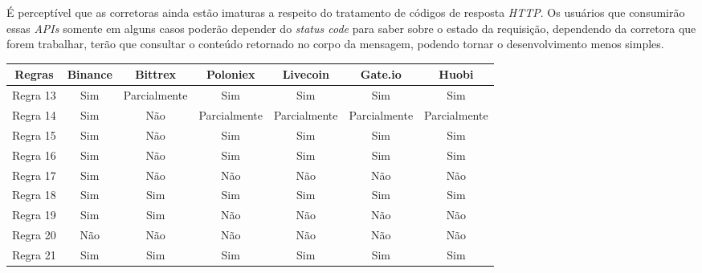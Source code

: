 É perceptível que as corretoras ainda estão imaturas a respeito do tratamento de códigos de resposta \textit{HTTP}. Os usuários que consumirão essas \textit{APIs} somente em alguns casos poderão depender do \textit{status code} para saber sobre o estado da requisição, dependendo da corretora que forem trabalhar, terão que consultar o conteúdo retornado no corpo da mensagem, podendo tornar o desenvolvimento menos simples. 

\begin{table}[h]
    \centering
    \begin{tabular}{|c|c|c|c|c|c|c|}
        \hline
        \textbf{Regras} & \textbf{Binance} & \textbf{Bittrex} & \textbf{Poloniex} & \textbf{Livecoin} & \textbf{Gate.io} & \textbf{Huobi} \\ \hline
        Regra 13        & Sim                & Parcialmente       & Sim               & Sim                 & Sim                & Sim              \\ \hline
        Regra 14        & Sim                & Não                & Parcialmente      & Parcialmente        & Parcialmente       & Parcialmente     \\ \hline
        Regra 15        & Sim                & Não                & Sim               & Sim                 & Sim                & Sim              \\ \hline
        Regra 16        & Sim                & Não                & Sim               & Sim                 & Sim                & Sim              \\ \hline
        Regra 17        & Sim                & Não                & Não               & Não                 & Não                & Não              \\ \hline
        Regra 18        & Sim                & Sim                & Sim               & Sim                 & Sim                & Sim              \\ \hline
        Regra 19        & Sim                & Sim                & Não               & Não                 & Não                & Não              \\ \hline
        Regra 20        & Não                & Não                & Não               & Não                 & Não                & Não              \\ \hline
        Regra 21        & Sim                & Sim                & Sim               & Sim                 & Sim                & Sim              \\ \hline

\end{tabular}
\end{table}
